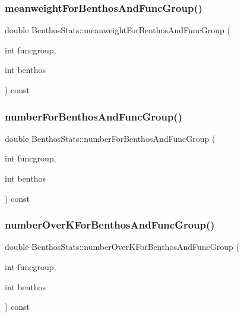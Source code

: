 \mbox{\label{class_benthos_stats_a04200e196a43e84fce95871a83a36391}} 
\subsubsection{\texorpdfstring{meanweightForBenthosAndFuncGroup()}{meanweightForBenthosAndFuncGroup()}}
{\footnotesize\ttfamily double Benthos\+Stats\+::meanweight\+For\+Benthos\+And\+Func\+Group (\begin{DoxyParamCaption}\item[{int}]{funcgroup,  }\item[{int}]{benthos }\end{DoxyParamCaption}) const}

\mbox{\label{class_benthos_stats_a8b5e30e63913e97ab2700e4069aab03d}} 
\subsubsection{\texorpdfstring{numberForBenthosAndFuncGroup()}{numberForBenthosAndFuncGroup()}}
{\footnotesize\ttfamily double Benthos\+Stats\+::number\+For\+Benthos\+And\+Func\+Group (\begin{DoxyParamCaption}\item[{int}]{funcgroup,  }\item[{int}]{benthos }\end{DoxyParamCaption}) const}

\mbox{\label{class_benthos_stats_ab7ef495b4628fe7b039afc1caf7ebdf9}} 
\subsubsection{\texorpdfstring{numberOverKForBenthosAndFuncGroup()}{numberOverKForBenthosAndFuncGroup()}}
{\footnotesize\ttfamily double Benthos\+Stats\+::number\+Over\+K\+For\+Benthos\+And\+Func\+Group (\begin{DoxyParamCaption}\item[{int}]{funcgroup,  }\item[{int}]{benthos }\end{DoxyParamCaption}) const}

